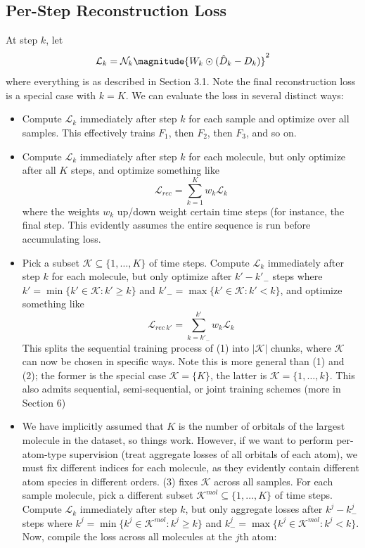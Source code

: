 \documentclass[12pt]{article}
\begin{document}
    \subsection{Per-Step Reconstruction Loss}
    At step $k$, let
    \begin{equation}
        \mathcal{L}_k = \mathcal{N}_k \magnitude{W_k \odot (\hat D_k - D_k)}^2
    \end{equation}
    where everything is as described in Section 3.1. Note the final reconstruction loss is a special case with $k =K$. We can evaluate the loss in several distinct ways:
    \begin{itemize}
        \item[(1)] Compute $\mathcal{L}_k$ immediately after step $k$ for each sample and optimize over all samples. This effectively trains $F_1$, then $F_2$, then $F_3$, and so on. 
        \item[(2)] Compute $\mathcal{L}_k$ immediately after step $k$ for each molecule, but only optimize after all $K$ steps, and optimize something like
        \begin{equation}
            \mathcal{L}_{rec} = \sum_{k=1}^K w_k \mathcal{L}_k
        \end{equation}
        where the weights $w_k$ up/down weight certain time steps (for instance, the final step. This evidently assumes the entire sequence is run before accumulating loss. 
        \item[(3)] Pick a subset $\mathcal{K} \subseteq \{1, \ldots, K\}$ of time steps. Compute $\mathcal{L}_k$ immediately after step $k$ for each molecule, but only optimize after $k' - k'_- $ steps where $k' = \min \{k' \in \mathcal{K}:k' \geq k\}$ and $k'_- = \max \{k' \in \mathcal{K}:k' < k\}$, and optimize something like
        \begin{equation}
            \mathcal{L}_{rec \ k'} = \sum_{k=k'_-}^{k'} w_k \mathcal{L}_k
        \end{equation}
        This splits the sequential training process of (1) into $|\mathcal{K}|$ chunks, where $\mathcal{K}$ can now be chosen in specific ways. Note this is more general than (1) and (2); the former is the special case $\mathcal{K} = \{K\}$, the latter is $\mathcal{K} = \{1, \ldots, k\}$. This also admits  sequential, semi-sequential, or joint training schemes (more in Section 6)
        \item[(4)] We have implicitly assumed that $K$ is the number of orbitals of the largest molecule in the dataset, so things work. However, if we want to perform per-atom-type supervision (treat aggregate losses of all orbitals of each atom), we must fix different indices for each molecule, as they evidently contain different atom species in different orders. (3) fixes $\mathcal{K}$ across all samples. For each sample molecule, pick a different subset $\mathcal{K}^{mol} \subseteq \{1, \ldots, K\}$ of time steps. Compute $\mathcal{L}_k$ immediately after step $k$, but only aggregate losses after $k^j - k^j_- $ steps where $k^j = \min \{k^j \in \mathcal{K}^{mol}:k^j \geq k\}$ and $k^j_- = \max \{k^j \in \mathcal{K}^{mol}:k^j < k\}$. Now, compile the loss across all molecules at the $j$th atom:

\end{itemize}
\end{document}
